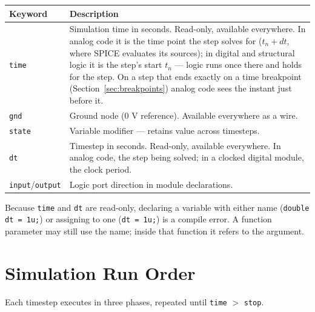 \documentclass[11pt, a4paper]{article}
\newcommand{\code}[1]{\texttt{\small #1}}
\begin{document}
\begin{center}
\begin{tabular}{@{} L{3cm} L{10cm} @{}}
  \toprule
  \textbf{Keyword} & \textbf{Description} \\
  \midrule
  \code{time}            & Simulation time in seconds. Read-only, available everywhere. In analog code it is the time point the step solves for ($t_n + dt$, where SPICE evaluates its sources); in digital and structural logic it is the step's start $t_n$ --- logic runs once there and holds for the step. On a step that ends exactly on a time breakpoint (Section~\ref{sec:breakpoints}) analog code sees the instant just before it. \\
  \code{gnd}             & Ground node (0 V reference). Available everywhere as a wire. \\
  \code{state}           & Variable modifier — retains value across timesteps. \\
  \code{dt}              & Timestep in seconds. Read-only, available everywhere. In analog code, the step being solved; in a clocked digital module, the clock period.  \\
  \code{input}/\code{output} & Logic port direction in module declarations. \\
  \bottomrule
\end{tabular}
\end{center}

Because \code{time} and \code{dt} are read-only, declaring a variable with
either name (\code{double dt = 1u;}) or assigning to one (\code{dt = 1u;}) is a
compile error. A function parameter may still use the name; inside that
function it refers to the argument.

\section{Simulation Run Order}

Each timestep executes in three phases, repeated until
\code{time} $>$ \code{stop}.
\end{document}
